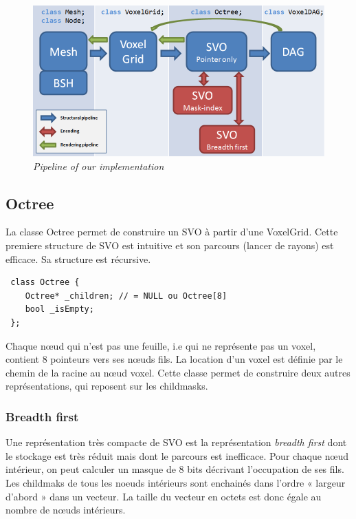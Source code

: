 \documentclass[a4paper]{article}
\begin{document}
\begin{figure}
\centering
\includegraphics[width=1\textwidth]{ClassGraph.png}
\caption{\label{fig:triceratops}\textit{Pipeline of our implementation}}
\end{figure}


\subsection{Octree}
La classe Octree permet de construire un SVO à partir d'une VoxelGrid. Cette premiere structure de SVO est intuitive et son parcours (lancer de rayons) est efficace. Sa structure est récursive.

\begin{lstlisting}
 class Octree {
 	Octree* _children; // = NULL ou Octree[8]
 	bool _isEmpty;
 };
\end{lstlisting}

Chaque nœud qui n’est pas une feuille, i.e qui ne représente pas un voxel, contient 8 pointeurs vers ses nœuds fils. La location d'un voxel est définie par le chemin de la racine au nœud voxel. Cette classe permet de construire deux autres représentations, qui reposent sur les childmasks. \\ 

\subsubsection{Breadth first} %
\label{ssub:breadth_first}
Une représentation très compacte de SVO est la représentation \textit{breadth first}  dont le stockage est très réduit mais dont le parcours est inefficace. Pour chaque nœud intérieur, on peut calculer un masque de 8 bits décrivant l’occupation de ses fils. Les childmaks de tous les noeuds intérieurs sont enchainés dans l’ordre « largeur d’abord » dans un vecteur. La taille du vecteur en octets est donc égale au nombre de nœuds intérieurs. \\
\end{document}

